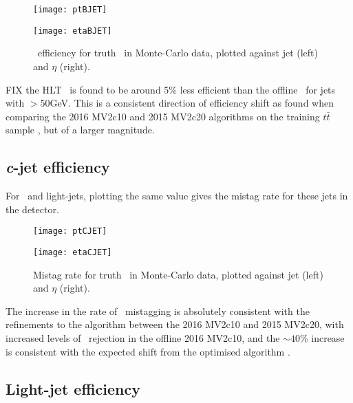 		\begin{figure}[h]
			\centering
			\begin{minipage}[h]{0.48\linewidth}
				\texttt{[image: ptBJET]}

			\end{minipage}
			\quad
			\begin{minipage}[h]{0.48\linewidth}
				\texttt{[image: etaBJET]}
			\end{minipage}
			\caption{\btag\, efficiency for truth \bjets\, in Monte-Carlo data, plotted against jet \pt (left) and $\eta$ (right).}
			\label{fig:MC:bjetefficiency}
		\end{figure}

		FIX
		 the HLT \btag\, is found to be around 5\% less efficient than the offline \btag\, for jets with \pt$>50$GeV. This is a consistent direction of efficiency shift as found when comparing the 2016 MV2c10 and 2015 MV2c20 algorithms on the training $t\bar{t}$ sample \cite{bTagOptimisation}, but of a larger magnitude.

	\subsection{\textit{c}-jet efficiency}
	For \cjets\, and light-jets, plotting the same value gives the mistag rate for these jets in the detector.

		\begin{figure}[h]
			\centering
			\begin{minipage}[h]{0.48\linewidth}
				\texttt{[image: ptCJET]}

			\end{minipage}
			\quad
			\begin{minipage}[h]{0.48\linewidth}
				\texttt{[image: etaCJET]}
			\end{minipage}
			\caption{Mistag rate for truth \bjets\, in Monte-Carlo data, plotted against jet \pt (left) and $\eta$ (right).}
			\label{fig:MC:cjetefficiency}
		\end{figure}

		 The increase in the rate of \cjet\, mistagging is absolutely consistent with the refinements to the algorithm between the 2016 MV2c10 and 2015 MV2c20, with increased levels of \cjet\, rejection in the offline 2016 MV2c10, and the $\sim40$\% increase is consistent with the expected shift from the optimised algorithm \cite{btagOptimisation}.


\newpage
	\subsection{Light-jet efficiency}

